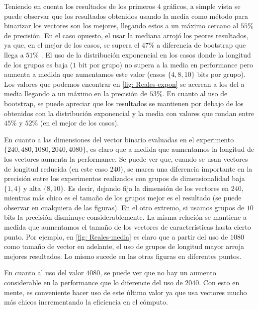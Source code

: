 	Teniendo en cuenta los resultados de los primeros $4$ gráficos, a simple vista se puede observar que los resultados obtenidos usando la media como método para binarizar los vectores son los mejores, llegando estos a un máximo cercano al $55\%$ de precisión. En el caso opuesto, el usar la mediana arrojó los peores resultados, ya que, en el mejor de los casos, se supera el $47\%$ a diferencia de bootstrap que llega a $51\%$ . El uso de la distribución exponencial en los casos donde la longitud de los grupos es baja ($1$ bit por grupo) no supera a la media en performance pero aumenta a medida que aumentamos este valor (casos $\{ 4, 8, 10\}$ bits por grupo). Los valores que podemos encontrar en \ref{fig: Reales-expon} se acercan a los del a media llegando a un máximo en la precisión de $53\%$. En cuanto al uso de bootstrap, se puede apreciar que los resultados se mantienen por debajo de los obtenidos con la distribución exponencial y la media con valores que rondan entre $45\%$ y $52\%$ (en el mejor de los casos).

	En cuanto a las dimensiones del vector binario evaluadas en el experimento $\{ 240, 480, 1080, 2040, 4080 \}$, es claro que a medida que aumentamos la longitud de los vectores aumenta la performance. Se puede ver que, cuando se usan vectores de longitud reducida (en este caso $240$), se marca una diferencia importante en la precisión entre los experimentos realizados con grupos de dimensionalidad baja $\{ 1, 4 \}$ y alta $\{8, 10\}$. Es decir, dejando fija la dimensión de los vectores en $240$, mientras más chico es el tamaño de los grupos mejor es el resultado (se puede observar en cualquiera de las figuras). En el otro extremo, si usamos grupos de $10$ bits la precisión disminuye considerablemente. La misma relación se mantiene a medida que aumentamos el tamaño de los vectores de características hasta cierto punto. Por ejemplo, en \ref{fig: Reales-media} es claro que a partir del uso de $1080$ como tamaño de vector en adelante, el uso de grupos de longitud mayor arroja mejores resultados. Lo mismo sucede en las otras figuras en diferentes puntos.

	En cuanto al uso del valor $4080$, se puede ver que no hay un aumento considerable en la performance que lo diferencie del uso de $2040$. Con esto en mente, es conveniente hacer uso de este último valor ya que usa vectores mucho más chicos incrementando la eficiencia en el cómputo.

